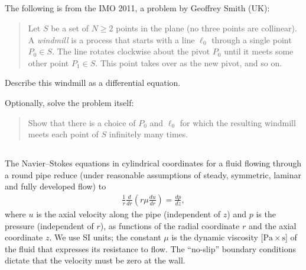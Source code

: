 \documentclass[12pt,a4paper]{article}
\begin{document}
    

    \subsection{}
    
    The following is from
    the IMO 2011,
    a problem 
    by Geoffrey Smith (UK):
    \begin{quote}
        Let $S$ be a set of $N \geq 2$ points in the plane (no three points are collinear). 
        A \emph{windmill} 
        is a process that 
        starts with a line $\ell_0$ through a single point $P_0 \in S$. 
        The line rotates clockwise about the pivot $P_0$ until 
        it meets some other point $P_1 \in S$. 
        This point takes over as the new pivot, and so on.
    \end{quote}
    Describe this windmill as a differential equation.
    
    Optionally, solve the problem itself:
    \begin{quote}
        Show that there is a choice of $P_0$ and $\ell_0$
        for which
        the resulting windmill 
        meets each point of $S$ infinitely many times.
    \end{quote}
    
    
    
    \subsection{}
    
    The Navier--Stokes equations 
    in cylindrical coordinates
    for a fluid flowing
    through a round pipe
    reduce 
    (under reasonable assumptions of steady, symmetric, laminar and fully developed flow)
    to 
    \begin{align}
        \frac{1}{r}
        \frac{d}{dr} \left( r \mu \frac{d u}{dr} \right)
        =
        \frac{d p}{d z}
        ,
    \end{align}
    where $u$ is the axial velocity along the pipe
    (independent of $z$)
    and $p$ is the pressure
    (independent of $r$),
    as functions of the radial coordinate $r$ and the axial coordinate $z$.
    We use SI units;
    the constant $\mu$ is the dynamic viscosity [$\mathrm{Pa \times s}$]
    of the fluid
    that expresses its resistance to flow.
    The ``no-slip'' boundary conditions 
    dictate that 
    the velocity must be zero at the wall.
    
\end{document}
